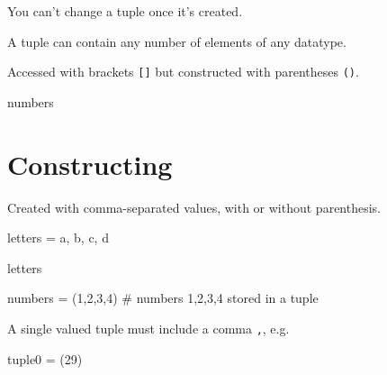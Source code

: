 \documentclass[
  letterpaper,
  DIV=11,
  numbers=noendperiod]{scrreprt}
\newenvironment{Shaded}{\begin{snugshade}}{\end{snugshade}}
\newcommand{\CommentTok}[1]{\textcolor[rgb]{0.37,0.37,0.37}{#1}}
\newcommand{\DecValTok}[1]{\textcolor[rgb]{0.68,0.00,0.00}{#1}}
\newcommand{\NormalTok}[1]{\textcolor[rgb]{0.00,0.23,0.31}{#1}}
\newcommand{\OperatorTok}[1]{\textcolor[rgb]{0.37,0.37,0.37}{#1}}
\newcommand{\StringTok}[1]{\textcolor[rgb]{0.13,0.47,0.30}{#1}}
\begin{document}
You can't change a tuple once it's created.

A tuple can contain any number of elements of any datatype.

Accessed with brackets \texttt{{[}{]}} but constructed with parentheses
\texttt{()}.

\begin{Shaded}
\begin{Highlighting}[]
\NormalTok{numbers}
\end{Highlighting}
\end{Shaded}

\hypertarget{constructing-5}{%
\section{Constructing}\label{constructing-5}}

Created with comma-separated values, with or without parenthesis.

\begin{Shaded}
\begin{Highlighting}[]
\NormalTok{letters }\OperatorTok{=} \StringTok{\textquotesingle{}a\textquotesingle{}}\NormalTok{, }\StringTok{\textquotesingle{}b\textquotesingle{}}\NormalTok{, }\StringTok{\textquotesingle{}c\textquotesingle{}}\NormalTok{, }\StringTok{\textquotesingle{}d\textquotesingle{}}
\end{Highlighting}
\end{Shaded}

\begin{Shaded}
\begin{Highlighting}[]
\NormalTok{letters}
\end{Highlighting}
\end{Shaded}

\begin{Shaded}
\begin{Highlighting}[]
\NormalTok{numbers }\OperatorTok{=}\NormalTok{ (}\DecValTok{1}\NormalTok{,}\DecValTok{2}\NormalTok{,}\DecValTok{3}\NormalTok{,}\DecValTok{4}\NormalTok{) }\CommentTok{\# numbers 1,2,3,4 stored in a tuple}
\end{Highlighting}
\end{Shaded}

A single valued tuple must include a comma \texttt{,}, e.g.

\begin{Shaded}
\begin{Highlighting}[]
\NormalTok{tuple0 }\OperatorTok{=}\NormalTok{ (}\DecValTok{29}\NormalTok{)}
\end{Highlighting}
\end{Shaded}
\end{document}

